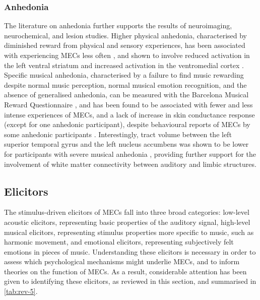 

\subsubsection{Anhedonia}

The literature on anhedonia further supports the results of neuroimaging, neurochemical, and lesion studies. Higher physical anhedonia, characterised by diminished reward from physical and sensory experiences, has been associated with experiencing MECs less often \parencite{nusbaum2015}, and shown to involve reduced activation in the left ventral striatum and increased activation in the ventromedial cortex \parencites{dowd2012, harvey2007}[as cited by][]{nusbaum2015}. Specific musical anhedonia, characterised by a failure to find music rewarding despite normal music perception, normal musical emotion recognition, and the absence of generalised anhedonia, can be measured with the Barcelona Musical Reward Questionnaire \parencite{masherrero2013}, and has been found to be associated with fewer and less intense experiences of MECs, and a lack of increase in skin conductance response (except for one anhedonic participant), despite behavioural reports of MECs by some anhedonic participants \parencite{masherrero2014}. Interestingly, tract volume between the left superior temporal gyrus and the left nucleus accumbens was shown to be lower for participants with severe musical anhedonia \parencite{loui2017}, providing further support for the involvement of white matter connectivity between auditory and limbic structures.

\subsection{Elicitors}
\label{se:rev-results-6}

The stimulus-driven elicitors of MECs fall into three broad categories: low-level acoustic elicitors, representing basic properties of the auditory signal, high-level musical elicitors, representing stimulus properties more specific to music, such as harmonic movement, and emotional elicitors, representing subjectively felt emotions in pieces of music. Understanding these elicitors is necessary in order to assess which psychological mechanisms might underlie MECs, and to inform theories on the function of MECs. As a result, considerable attention has been given to identifying these elicitors, as reviewed in this section, and summarised in \autoref{tab:rev-5}.

